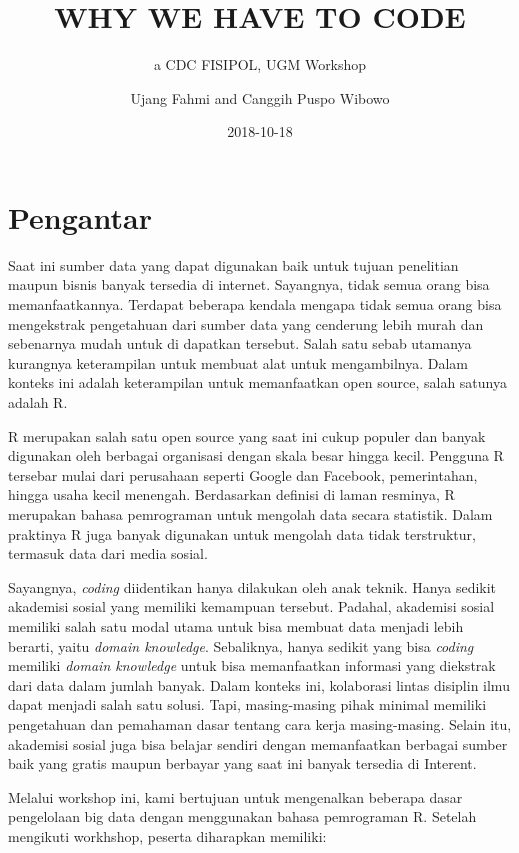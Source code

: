 \documentclass[]{book}
\title{WHY WE HAVE TO CODE}
\subtitle{a CDC FISIPOL, UGM Workshop}
\author{Ujang Fahmi and Canggih Puspo Wibowo}
\date{2018-10-18}
\theoremstyle{definition}
\theoremstyle{definition}
\theoremstyle{definition}
\theoremstyle{remark}
\begin{document}
\maketitle

{
\setcounter{tocdepth}{1}
\tableofcontents
}
\hypertarget{pengantar}{%
\chapter*{Pengantar}\label{pengantar}}

Saat ini sumber data yang dapat digunakan baik untuk tujuan penelitian
maupun bisnis banyak tersedia di internet. Sayangnya, tidak semua orang
bisa memanfaatkannya. Terdapat beberapa kendala mengapa tidak semua
orang bisa mengekstrak pengetahuan dari sumber data yang cenderung lebih
murah dan sebenarnya mudah untuk di dapatkan tersebut. Salah satu sebab
utamanya kurangnya keterampilan untuk membuat alat untuk mengambilnya.
Dalam konteks ini adalah keterampilan untuk memanfaatkan open source,
salah satunya adalah R.

R merupakan salah satu open source yang saat ini cukup populer dan
banyak digunakan oleh berbagai organisasi dengan skala besar hingga
kecil. Pengguna R tersebar mulai dari perusahaan seperti Google dan
Facebook, pemerintahan, hingga usaha kecil menengah. Berdasarkan
definisi di laman resminya, R merupakan bahasa pemrograman untuk
mengolah data secara statistik. Dalam praktinya R juga banyak digunakan
untuk mengolah data tidak terstruktur, termasuk data dari media sosial.

Sayangnya, \emph{coding} diidentikan hanya dilakukan oleh anak teknik.
Hanya sedikit akademisi sosial yang memiliki kemampuan tersebut.
Padahal, akademisi sosial memiliki salah satu modal utama untuk bisa
membuat data menjadi lebih berarti, yaitu \emph{domain knowledge}.
Sebaliknya, hanya sedikit yang bisa \emph{coding} memiliki \emph{domain
knowledge} untuk bisa memanfaatkan informasi yang diekstrak dari data
dalam jumlah banyak. Dalam konteks ini, kolaborasi lintas disiplin ilmu
dapat menjadi salah satu solusi. Tapi, masing-masing pihak minimal
memiliki pengetahuan dan pemahaman dasar tentang cara kerja
masing-masing. Selain itu, akademisi sosial juga bisa belajar sendiri
dengan memanfaatkan berbagai sumber baik yang gratis maupun berbayar
yang saat ini banyak tersedia di Interent.

Melalui workshop ini, kami bertujuan untuk mengenalkan beberapa dasar
pengelolaan big data dengan menggunakan bahasa pemrograman R. Setelah
mengikuti workhshop, peserta diharapkan memiliki:
\end{document}
